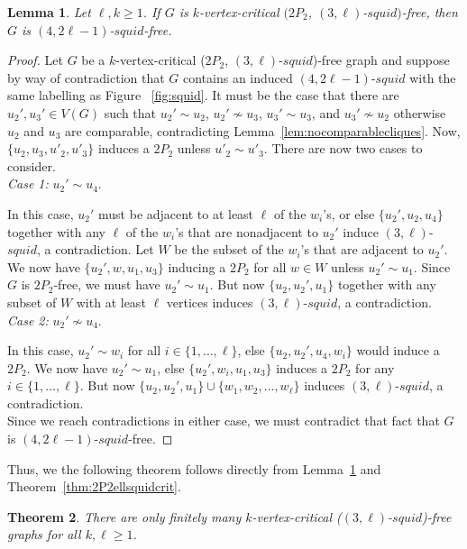 \documentclass[11pt]{article}
\newtheorem{theorem}{Theorem}[section]
\newtheorem{lemma}[theorem]{Lemma}
\theoremstyle{definition}
\newcommand{\squid}[1]{$(4,#1)$-$squid$}
\newcommand{\hl}[1]{$(3,#1)$-$squid$}
\begin{document}
\begin{lemma}\label{lem:2P2Hellfreeimpliesellsquidfree}
Let $\ell,k\ge 1$. If $G$ is $k$-vertex-critical $(2P_2$, \hl{\ell}$)$-free, then $G$ is \squid{2\ell-1}-free.
\end{lemma}
\begin{proof}
Let $G$ be a $k$-vertex-critical ($2P_2$, \hl{\ell})-free graph and suppose by way of contradiction that $G$ contains an induced \squid{2\ell-1} with the same labelling as Figure ~\ref{fig:squid}. It must be the case that there are $u_2',u_3'\in V(G)$ such that  $u_2'\sim u_2$, $u_2'\nsim u_3$, $u_3'\sim u_3$, and $u_3'\nsim u_2$ otherwise $u_2$ and $u_3$ are comparable, contradicting Lemma~\ref{lem:nocomparablecliques}. Now, $\{ u_2, u_3, u'_2, u'_3 \}$ induces a $2P_2$ unless $u'_2 \sim u'_3$. There are now two cases to consider.\\

\noindent \textit{Case 1:} $u_2'\sim u_4$.

In this case, $u_2'$ must be adjacent to at least $\ell$ of the $w_i$'s, or else $\{u_2',u_2,u_4\}$ together with any $\ell$ of the $w_i$'s that are nonadjacent to $u_2'$ induce \hl{\ell}, a contradiction. Let $W$ be the subset of the $w_i$'s that are adjacent to $u_2'$. We now have $\{u_2',w,u_1,u_3\}$ inducing a $2P_2$ for all $w\in W$ unless $u_2'\sim u_1$. Since $G$ is $2P_2$-free, we must have $u_2'\sim u_1$. But now $\{u_2,u_2',u_1\}$ together with any subset of $W$ with at least $\ell$ vertices induces \hl{\ell}, a contradiction.\\

 
 \noindent \textit{Case 2:} $u_2'\nsim u_4$.

In this case, $u_2'\sim w_i$ for all $i\in\{1,\dots,\ell\}$, else $\{u_2,u_2',u_4,w_i\}$ would induce a $2P_2$. We now have $u_2'\sim u_1$, else $\{u_2',w_i,u_1,u_3\}$ induces a $2P_2$ for any $i\in\{1,\dots,\ell\}$. But now $\{u_2,u_2',u_1\}\cup\{w_1,w_2,\dots, w_{\ell}\}$ induces \hl{\ell}, a contradiction.\\


Since we reach contradictions in either case, we must contradict that fact that $G$ is \squid{2\ell-1}-free.
\end{proof}




Thus, we the following theorem follows directly from Lemma~\ref{lem:2P2Hellfreeimpliesellsquidfree} and Theorem~\ref{thm:2P2ellsquidcrit}.

\begin{theorem}
There are only finitely many $k$-vertex-critical (\hl{\ell})-free graphs for all $k,\ell\ge 1$.
\end{theorem}
\end{document}
